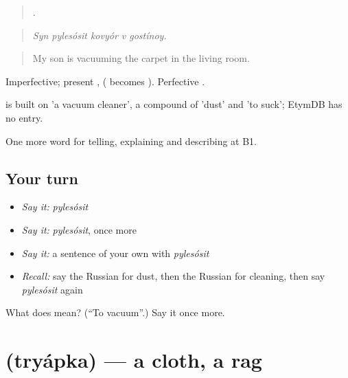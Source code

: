 \begin{quote}
    .
\end{quote}

\begin{quote}
\emph{Syn pylesósit kovyór v gostínoy.}
\end{quote}

\begin{quote}
My son is vacuuming the carpet in the living room.
\end{quote}

Imperfective; present ,  ( becomes ). Perfective .

\begin{cousinweb}
\emph{} is built on \emph{} 'a vacuum cleaner', a compound of \emph{} 'dust' and \emph{} 'to suck'; EtymDB has no entry.
\end{cousinweb}

\begin{grammarlens}[title={What you've built}]
One more word for telling, explaining and describing at B1.
\end{grammarlens}

\subsection*{Your turn}
\begin{itemize}
\raggedright
  \item \emph{Say it:} \emph{pylesósit}
  \item \emph{Say it:} \emph{pylesósit}, once more
  \item \emph{Say it:} a sentence of your own with \emph{pylesósit}
  \item \emph{Recall:} say the Russian for dust, then the Russian for cleaning, then say \emph{pylesósit} again
\end{itemize}

\begin{tcolorbox}[breakable,colback=teal!4,colframe=teal!35!black,title={Before you move on}]
What does  mean? (\textquotedblleft{}To vacuum\textquotedblright{}.) Say it once more.
\end{tcolorbox}
\section[\texorpdfstring{\ru{тряпка} (tryápka)}{тряпка (tryápka)}]{ (tryápka) — a cloth, a rag}

